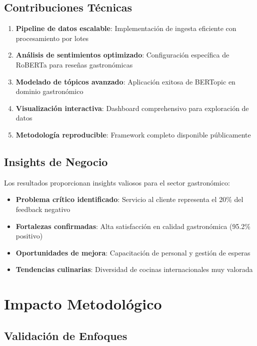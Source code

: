 \documentclass[12pt,a4paper,twoside,openany]{book}
\begin{document}
\subsection{Contribuciones Técnicas}

\begin{enumerate}
    \item \textbf{Pipeline de datos escalable}: Implementación de ingesta eficiente con procesamiento por lotes
    \item \textbf{Análisis de sentimientos optimizado}: Configuración específica de RoBERTa para reseñas gastronómicas
    \item \textbf{Modelado de tópicos avanzado}: Aplicación exitosa de BERTopic en dominio gastronómico
    \item \textbf{Visualización interactiva}: Dashboard comprehensivo para exploración de datos
    \item \textbf{Metodología reproducible}: Framework completo disponible públicamente
\end{enumerate}

\subsection{Insights de Negocio}

Los resultados proporcionan insights valiosos para el sector gastronómico:

\begin{itemize}
    \item \textbf{Problema crítico identificado}: Servicio al cliente representa el 20\% del feedback negativo
    \item \textbf{Fortalezas confirmadas}: Alta satisfacción en calidad gastronómica (95.2\% positivo)
    \item \textbf{Oportunidades de mejora}: Capacitación de personal y gestión de esperas
    \item \textbf{Tendencias culinarias}: Diversidad de cocinas internacionales muy valorada
\end{itemize}

\section{Impacto Metodológico}

\subsection{Validación de Enfoques}
\end{document}
